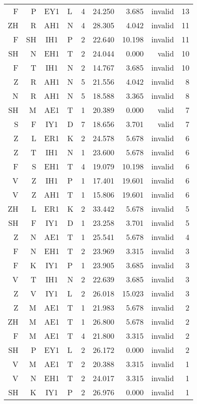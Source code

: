 \documentclass[12pt]{article}
\begin{document}
\begin{longtable}{r@{ }r@{ }c@{ }l@{ } rrrrr}
 F & P & EY1 & L & 4 & 24.250 & 3.685 & invalid & 13 \\
ZH & R & AH1 & N & 4 & 28.305 & 4.042 & invalid & 11 \\
F & SH & IH1 & P & 2 & 22.640 & 10.198 & invalid & 11 \\
SH & N & EH1 & T & 2 & 24.044 &  0.000 &   valid & 10 \\
 F & T & IH1 & N & 2 & 14.767 &  3.685 & invalid & 10 \\
 Z & R & AH1 & N & 5 & 21.556 &  4.042 & invalid & 8 \\
 N & R & AH1 & N & 5 & 18.588 &  3.365 & invalid & 8 \\
SH & M & AE1 & T & 1 & 20.389 &  0.000 &   valid & 7 \\
 S & F & IY1 & D & 7 & 18.656 &  3.701 &   valid & 7 \\
 Z & L & ER1 & K & 2 & 24.578 &  5.678 & invalid & 6 \\
 Z & T & IH1 & N & 1 & 23.600 &  5.678 & invalid & 6 \\
 F & S & EH1 & T & 4 & 19.079 & 10.198 & invalid & 6 \\
 V & Z & IH1 & P & 1 & 17.401 & 19.601 & invalid & 6 \\
 V & Z & AH1 & T & 1 & 15.806 & 19.601 & invalid & 6 \\
ZH & L & ER1 & K & 2 & 33.442 &  5.678 & invalid & 5 \\
SH & F & IY1 & D & 1 & 23.258 &  3.701 & invalid & 5 \\
 Z & N & AE1 & T & 1 & 25.541 &  5.678 & invalid & 4 \\
 F & N & EH1 & T & 2 & 23.969 &  3.315 & invalid & 3 \\
 F & K & IY1 & P & 1 & 23.905 &  3.685 & invalid & 3 \\
 V & T & IH1 & N & 2 & 22.639 &  3.685 & invalid & 3 \\
 Z & V & IY1 & L & 2 & 26.018 & 15.023 & invalid & 3 \\
 Z & M & AE1 & T & 1 & 21.983 &  5.678 & invalid & 2 \\
ZH & M & AE1 & T & 1 & 26.800 &  5.678 & invalid & 2 \\
 F & M & AE1 & T & 4 & 21.800 &  3.315 & invalid & 2 \\
SH & P & EY1 & L & 2 & 26.172 &  0.000 & invalid & 2 \\
 V & M & AE1 & T & 2 & 20.388 &  3.315 & invalid & 1 \\
 V & N & EH1 & T & 2 & 24.017 &  3.315 & invalid & 1 \\
SH & K & IY1 & P & 2 & 26.976 &  0.000 & invalid & 1 \\

\end{longtable}
\end{document}
